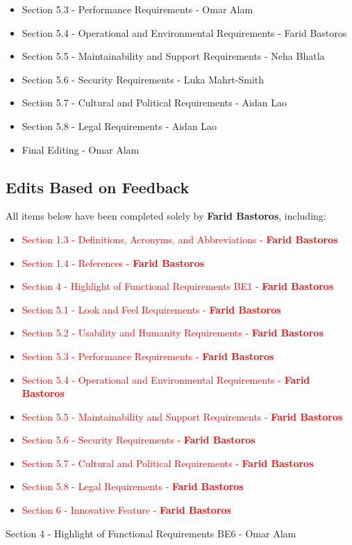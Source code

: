 \documentclass{article}
\begin{document}
\begin{itemize}
	\item Section 5.3 - Performance Requirements - Omar Alam
	\item Section 5.4 - Operational and Environmental Requirements - Farid Bastoros
	\item Section 5.5 - Maintainability and Support Requirements - Neha Bhatla
	\item Section 5.6 - Security Requirements - Luka Mahrt-Smith
	\item Section 5.7 - Cultural and Political Requirements - Aidan Lao
	\item Section 5.8 - Legal Requirements - Aidan Lao
	\item Final Editing - Omar Alam
\end{itemize}

\subsection{Edits Based on Feedback}

All items below have been completed solely by \textbf{Farid Bastoros}, including:

\begin{itemize}
	\item \textcolor{red}{Section 1.3 - Definitions, Acronyms, and Abbreviations - \textbf{Farid Bastoros}}
	\item \textcolor{red}{Section 1.4 - References - \textbf{Farid Bastoros}}
	\item \textcolor{red}{Section 4 - Highlight of Functional Requirements BE1 - \textbf{Farid Bastoros}}
	\item \textcolor{red}{Section 5.1 - Look and Feel Requirements - \textbf{Farid Bastoros}}
	\item \textcolor{red}{Section 5.2 - Usability and Humanity Requirements - \textbf{Farid Bastoros}}
	\item \textcolor{red}{Section 5.3 - Performance Requirements - \textbf{Farid Bastoros}}
	\item \textcolor{red}{Section 5.4 - Operational and Environmental Requirements - \textbf{Farid Bastoros}}
	\item \textcolor{red}{Section 5.5 - Maintainability and Support Requirements - \textbf{Farid Bastoros}}
	\item \textcolor{red}{Section 5.6 - Security Requirements - \textbf{Farid Bastoros}}
	\item \textcolor{red}{Section 5.7 - Cultural and Political Requirements - \textbf{Farid Bastoros}}
	\item \textcolor{red}{Section 5.8 - Legal Requirements - \textbf{Farid Bastoros}}
	\item \textcolor{red}{Section 6 - Innovative Feature - \textbf{Farid Bastoros}}
\end{itemize}
Section 4 - Highlight of Functional Requirements BE6 - Omar Alam 
\end{document}
